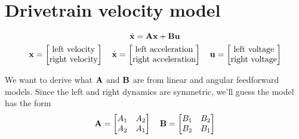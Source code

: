\section{Drivetrain velocity model}
\begin{equation*}
  \dot{\mathbf{x}} = \mathbf{A}\mathbf{x} + \mathbf{B}\mathbf{u}
\end{equation*}
\begin{equation*}
  \mathbf{x} = \begin{bmatrix}
    \text{left velocity} \\
    \text{right velocity}
  \end{bmatrix}
  \quad
  \dot{\mathbf{x}} = \begin{bmatrix}
    \text{left acceleration} \\
    \text{right acceleration}
  \end{bmatrix}
  \quad
  \mathbf{u} = \begin{bmatrix}
    \text{left voltage} \\
    \text{right voltage}
  \end{bmatrix}
\end{equation*}

We want to derive what $\mathbf{A}$ and $\mathbf{B}$ are from linear and angular
feedforward models. Since the left and right dynamics are symmetric, we'll guess
the model has the form
\begin{equation*}
  \mathbf{A} = \begin{bmatrix}
    A_1 & A_2 \\
    A_2 & A_1
  \end{bmatrix}
  \quad
  \mathbf{B} = \begin{bmatrix}
    B_1 & B_2 \\
    B_2 & B_1
  \end{bmatrix}
\end{equation*}

